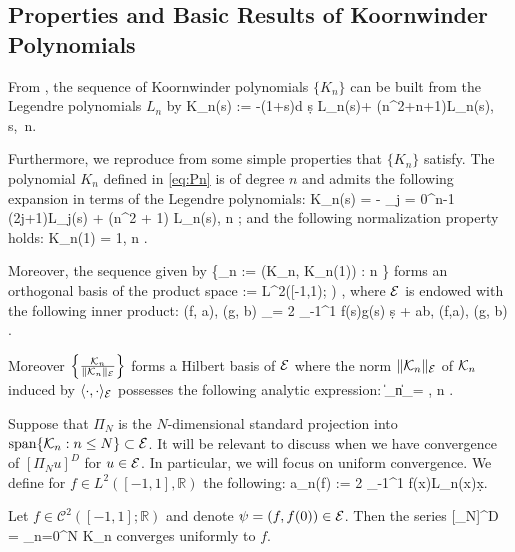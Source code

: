 \subsection{Properties and Basic Results of Koornwinder Polynomials}


From \cite[Eq.~(2.1)]{Koornwinder}, the sequence of Koornwinder polynomials \(\{K_n\}\) can be built from the Legendre polynomials \(L_n\) by 
\be\label{eq:Pn}
    K_n(s) := -(1+s)\frac d {\d s} L_n(s)+ (n^2+n+1)L_n(s), \quad s\in[-1,1],\  n\in\Nzero.
\ee

Furthermore, we reproduce from \cite[Prop.~3.1]{GalerkinApprox} some simple properties that \(\{K_n\}\) satisfy.
\bprop
The polynomial \(K_n\) defined in \eqref{eq:Pn} is of degree \(n\) and  admits the following expansion in terms of the Legendre polynomials:
\be\label{eq:Pn2}
    K_n(s) = - \sum_{j = 0}^{n-1} (2j+1)L_j(s) + (n^2 + 1) L_n(s), \qquad n \in \Nzero;
\ee
and the following normalization property holds:
\be
    K_n(1) = 1, \qquad n \in \Nzero.
\ee

Moreover, the sequence given by
\be
    \{_n := (K_n, K_n(1)) : n \in \Nzero\}
\ee 
forms an orthogonal basis of the  product space 
\be
     := L^2([-1,1); \R) \times  \R,
\ee 
where \(\mathcal E\) is endowed with the following inner product:
\be
    \langle (f, a), (g, b) \rangle_\mcE =  2 \int_{-1}^1 f(s)g(s) \d s  + ab, \quad (f,a), (g, b) \in \mcE.
\ee

Moreover \(\left\{ \frac{\mathcal K_n}{\| \mathcal K_n \|_\mathcal E} \right\}\) forms a Hilbert basis of $\mathcal E$ where 
the norm \(\| \mathcal K_n \|_\mathcal E\) of \(\mathcal K_n\) induced by  \(\langle \cdot, \cdot \rangle_\mathcal E\)  possesses the following analytic expression:
\be \label{eq:Pn_norm}
    \|\mcK_n\|_\mcE = , \qquad n \in \Nzero.
\ee
\eprop

Suppose that \(\Pi_N\) is the \(N\)-dimensional standard projection into \(\mbox{span}\{\mathcal K_n: n\leq N\} \subset \mathcal E\). It will be relevant to discuss when we have convergence of \([\Pi_N u]^D\) for \(u\in\mathcal E\). In particular, we will focus on uniform convergence. We define for \(f\in L^2([-1,1], \mathbb R)\) the following:
\be
a_n(f) :=  2 \int_{-1}^1 f(x)L_n(x)\d x.
\ee

\bprop\label{prop:uniform-conv}
Let \(f\in \mathcal C^2([-1,1];\mathbb R)\) and denote \(\psi = (f, f(0)) \in\mathcal E\). Then the series
\be\label{koorn-series}
    [\Pi_N\psi]^D = \sum_{n=0}^N  K_n
\ee
converges uniformly to \(f\).
\eprop

